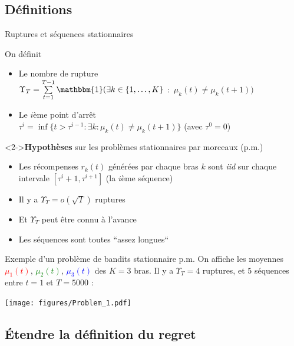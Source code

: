 \documentclass[11pt,french,ignorenonframetext,]{beamer}
\providecommand{\tightlist}{%
  \setlength{\itemsep}{0pt}\setlength{\parskip}{0pt}}
\begin{document}
\subsection{\hfill{}Définitions\hfill{}}

\begin{frame}{Ruptures et séquences stationnaires}

  On définit

  \begin{itemize}
    \item
    Le nombre de rupture\\
    $\Upsilon_T = \sum\limits_{t=1}^{T-1} \mathbbm{1}(\exists k\in \{1,\dots,K\}$ $:$ $\mu_k(t) \neq \mu_k(t+1) )$

    \item
    Le $i$ème point d'arrêt\\
    $\tau^{i} = \inf\{t > \tau^{i-1} : \exists k : \mu_k(t) \neq \mu_k(t+1)\}$
    \hfill{} (avec $\tau^0=0$)
  \end{itemize}

  \begin{block}<2->{\textbf{Hypothèses} sur les problèmes stationnaires par morceaux (p.m.)}
    \begin{itemize}\tightlist
      \item Les récompenses $r_k(t)$ générées par chaque bras $k$ sont \alert{\emph{iid} sur chaque intervale} $[ \tau^{i} + 1, \tau^{i+1} ]$ (la $i$ème séquence)
      \item Il y a $\Upsilon_T = o(\sqrt{T})$ ruptures
      \item Et \alert{$\Upsilon_T$ peut être connu à l'avance}
      \item Les séquences sont toutes ``assez longues``
  \end{itemize}
\end{block}
\end{frame}


\begin{frame}[plain]{Exemple d'un problème de bandits stationnaire p.m.}
  On affiche les moyennes \textcolor{red}{$\mu_1(t)$}, \textcolor{green}{$\mu_2(t)$}, \textcolor{blue}{$\mu_3(t)$}
  des $K=3$ bras.
  Il y a $\Upsilon_T=4$ ruptures, et $5$ séquences entre $t=1$ et $T=5000$ :
  \begin{center}
    \texttt{[image: figures/Problem\_1.pdf]}
  \end{center}
\end{frame}


\subsection{\hfill{}Étendre la définition du regret\hfill{}}
\end{document}
